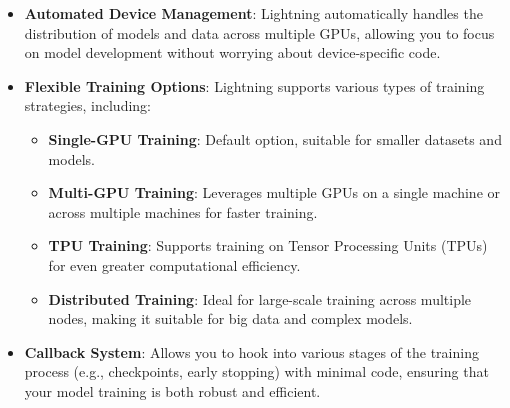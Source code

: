 \begin{itemize}
    \item \textbf{Automated Device Management}: Lightning automatically handles the distribution of models and data across multiple GPUs, allowing you to focus on model development without worrying about device-specific code.
    \item \textbf{Flexible Training Options}: Lightning supports various types of training strategies, including:
    \begin{itemize}
        \item \textbf{Single-GPU Training}: Default option, suitable for smaller datasets and models.
        \item \textbf{Multi-GPU Training}: Leverages multiple GPUs on a single machine or across multiple machines for faster training.
        \item \textbf{TPU Training}: Supports training on Tensor Processing Units (TPUs) for even greater computational efficiency.
        \item \textbf{Distributed Training}: Ideal for large-scale training across multiple nodes, making it suitable for big data and complex models.
    \end{itemize}
    \item \textbf{Callback System}: Allows you to hook into various stages of the training process (e.g., checkpoints, early stopping) with minimal code, ensuring that your model training is both robust and efficient.
\end{itemize}
